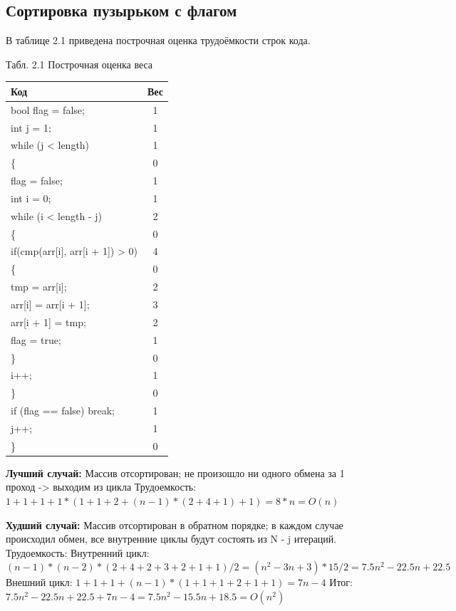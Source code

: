 \documentclass{report}
\begin{document}
\subsection{Сортировка пузырьком с флагом}
В таблице 2.1 приведена построчная оценка трудоёмкости строк кода.
\begin{center}
Табл. 2.1 Построчная оценка веса\newline
	\begin{tabular}{|l c|} 
 	\hline
	Код & Вес \\ [0.5ex] 
 	\hline
	bool flag = false; & 1\\
	\hline
	int j = 1; & 1\\
 	\hline
	while (j < length) & 1\\
	\hline
	\{ & 0\\
	\hline
	flag = false; & 1\\
	\hline
	int i = 0; & 1\\
 	\hline
	while (i < length - j) & 2\\
	\hline
	\{ & 0\\	
	\hline
	if(cmp(arr[i], arr[i + 1]) > 0) & 4\\
	\hline
	\{ & 0\\
	\hline
	tmp = arr[i]; & 2\\
	\hline
    arr[i] = arr[i + 1]; & 3\\
    \hline
    arr[i + 1] = tmp; & 2\\
    \hline
    flag = true; & 1\\
    \hline
    \} & 0\\
	\hline
	i++; & 1\\
	\hline
	\} & 0\\
	\hline
	if (flag == false) break;  & 1\\
	\hline
	j++; & 1\\
	\hline
	\} & 0\\
	\hline
	\end{tabular}
\end{center}

 
\textbf{Лучший случай:} Массив отсортирован; не произошло ни одного обмена за 1 проход -> выходим из цикла \newline
Трудоемкость:  $1 + 1 + 1 + 1 * (1 + 1 + 2 + (n - 1) * (2 + 4 + 1) + 1) = 8 * n = O(n)$

\textbf{Худший случай:}  Массив отсортирован в обратном порядке; в каждом случае происходил обмен, все внутренние циклы будут состоять из N - j итераций.\newline
Трудоемкость: 
\newline
Внутренний цикл: $(n - 1) * (n - 2) * (2 + 4 + 2 + 3 + 2 + 1 + 1) / 2 = (n^2 -3n + 3) * 15 / 2 = 7.5n^2 - 22.5n + 22.5$
\newline
Внешний цикл: $1 + 1 + 1 + (n - 1) * (1 + 1 + 1 + 2 + 1 + 1) = 7n - 4$
\newline
Итог: $7.5 n^2 - 22.5n + 22.5 + 7n - 4 = 7.5n^2 - 15.5n + 18.5 = O(n ^ 2)$
\end{document}
